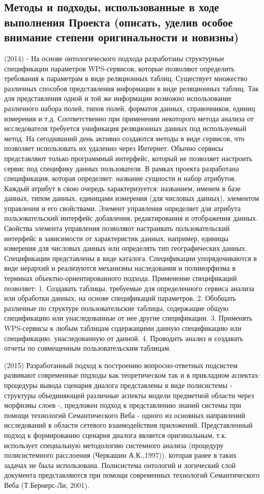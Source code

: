 \documentclass[12pt,a4paper]{ltxdoc}
\begin{document}
\subsection{Методы и подходы, использованные в ходе выполнения Проекта (описать,
  уделив особое внимание степени оригинальности и новизны)}
(2014) - На основе онтологического подхода разработаны структурные спецификации параметров WPS-сервисов, которые позволяют определить требования к параметрам в виде реляционных таблиц. Существует множество различных способов представления информации в виде реляционных таблиц. Так для представления одной и той же информации возможно использование различного набора полей, типов полей, форматов данных, справочников, единиц измерения и т.д. Соответственно при применении некоторого метода анализа от исследователя требуется унификация реляционных данных под используемый метод. На сегодняшний день активно создаются методы в виде сервисов, что позволяет использовать их удаленно через Интернет. Обычно сервисы представляют только программный интерфейс, который не позволяет настроить сервис под специфику данных пользователя. В рамках проекта разработана спецификация, которая определяет: название сущности и набор атрибутов. Каждый атрибут в свою очередь характеризуется: названием, именем в базе данных, типом данных, единицами измерения (для числовых данных), элементом управления и его свойствами. Элемент управления определяет для атрибута пользовательский интерфейс добавления, редактирования и отображения данных. Свойства элемента управления позволяют настраивать пользовательский интерфейс в зависимости от характеристик данных, например, единицы измерения для числовых данных или определять тип географических данных. Спецификации представлены в виде каталога. Спецификации упорядочиваются в виде иерархий и реализуются механизмы наследования и полиморфизма в терминах объектно-ориентированного подхода.
Применение спецификаций позволяет:
1. Создавать таблицы, требуемые для определенного сервиса анализа или обработки данных, на основе спецификаций параметров.
2. Обобщать различные по структуре пользовательские таблицы, содержащие общую спецификацию или унаследованные от нее другие спецификации.
3. Применять WPS-сервисы к любым таблицам содержащими данную спецификацию или спецификацию, унаследованную от данной.
4. Проводить анализ и создавать отчеты по совмещенным пользовательским таблицам.

(2015) Разработанный подход к построению вопросно-ответных подсистем развивают современные подходы как теоретическом так и в прикладном аспектах: процедуры вывода сценария диалога представлены в виде полисистемы - структуры объединяющей различные аспекты модели предметной области через морфизмы слоев -, предложен подход к представлению знаний системы при помощи технологий Семантического Веба - одного из основных направлений исследований в области сетевого взаимодействия приложений. Представленный подход к формированию сценария диалога является оригинальным, т.к. использует специальную методологию системного анализа (процедуру полисистемного расслоения (Черкашин А.К.,1997)), которая ранее в таких задачах не была использована. Полисистема онтологий и логический слой документа представляются при помощи современных технологий Семантического Веба (Т.Бернерс-Ли, 2001).
\end{document}
